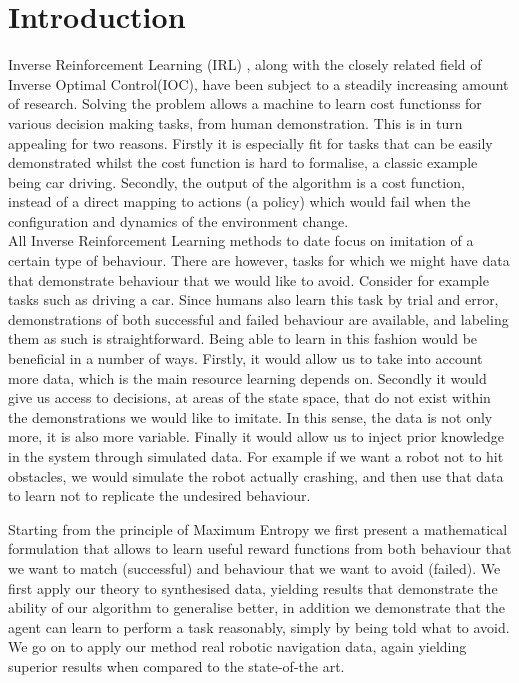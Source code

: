 \documentclass[letterpaper]{article}
\begin{document}
\section{Introduction}
	Inverse Reinforcement Learning (IRL) \cite{ng2000algorithms}, along with the closely related field of Inverse Optimal Control(IOC), have been subject to a steadily increasing amount of research. Solving the problem allows a machine to learn cost functionss for various decision making tasks, from human demonstration. This is in turn appealing for two reasons. Firstly it is especially fit for tasks that can be easily demonstrated whilst the cost function is hard to formalise, a classic example being car driving. Secondly, the output of the algorithm is a cost function, instead of a direct mapping to actions (a policy) which would fail when the configuration and dynamics of the environment change.\\
	All Inverse Reinforcement Learning methods to date focus on imitation of a certain type of behaviour. There are however, tasks for which we might have data that demonstrate behaviour that we would like to avoid. Consider for example tasks such as driving a car\cite{abbeel2004apprenticeship}. Since humans also learn this task by trial and error, demonstrations of both successful and failed behaviour are available, and labeling them as such is straightforward. Being able to learn in this fashion would be beneficial in a number of ways. Firstly, it would allow us to take into account more data, which is the main resource learning depends on. Secondly it would give us access to decisions, at areas of the state space, that do not exist within the demonstrations we would like to imitate. In this sense, the data is not only more, it is also more variable. Finally it would allow us to inject prior knowledge in the system through simulated data. For example if we want a robot not to hit obstacles, we would simulate the robot actually crashing, and then use that data to learn not to replicate the undesired behaviour. 

	 Starting from the principle of Maximum Entropy \cite{jaynes1957information} we first present a mathematical formulation that allows to learn useful reward functions from both behaviour that we want to match (successful) and behaviour that we want to avoid (failed). We first apply our theory to synthesised data, yielding results that demonstrate the ability of our algorithm to generalise better, in addition we demonstrate that the agent can learn to perform a task reasonably, simply by being told what to avoid. We go on to apply our method real robotic navigation data, again yielding superior results when compared to the state-of-the art.
\end{document}
